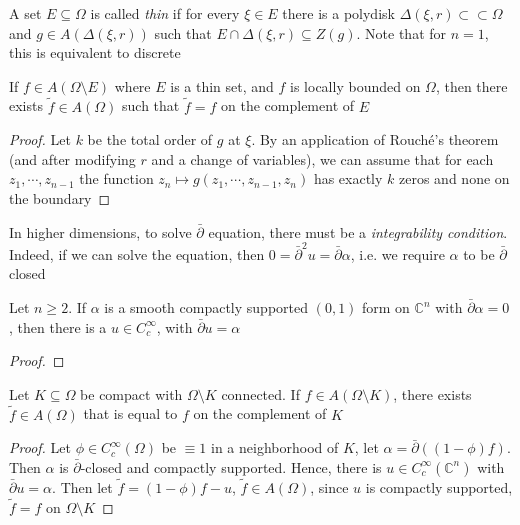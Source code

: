 \documentclass[../main.tex]{subfiles}
\begin{document}
\begin{definition}
A set $E\subseteq\Omega$ is called \textit{thin} if for every $\xi\in E$ there is a polydisk $\Delta(\xi,r)\subset\subset\Omega$ and $g\in A(\Delta(\xi,r))$ such that $E\cap\Delta(\xi,r)\subseteq Z(g)$. Note that for $n=1$, this is equivalent to discrete
\end{definition}

\begin{theorem}
If $f\in A(\Omega\setminus E)$ where $E$ is a thin set, and $f$ is locally bounded on $\Omega$, then there exists $\tilde f\in A(\Omega)$ such that $\tilde f=f$ on the complement of $E$
\end{theorem}

\begin{proof}
Let $k$ be the total order of $g$ at $\xi$. By an application of Rouch\'e's theorem (and after modifying $r$ and a change of variables), we can assume that for each $z_1,\cdots,z_{n-1}$ the function $z_n\mapsto g(z_1,\cdots,z_{n-1},z_n)$ has exactly $k$ zeros and none on the boundary
\end{proof}

In higher dimensions, to solve $\bar\partial$ equation, there must be a \textit{integrability condition}. Indeed, if we can solve the equation, then $0=\bar\partial^2u=\bar\partial\alpha$, i.e. we require $\alpha$ to be $\bar\partial$ closed

\begin{proposition}
Let $n\geq2$. If $\alpha$ is a smooth compactly supported $(0,1)$ form on $\mathbb C^n$ with $\bar\partial\alpha=0$, then there is a $u\in C_c^\infty$, with $\bar\partial u=\alpha$
\end{proposition}

\begin{proof}

\end{proof}

\begin{corollary}
Let $K\subseteq\Omega$ be compact with $\Omega\setminus K$ connected. If $f\in A(\Omega\setminus K)$, there exists $\tilde f\in A(\Omega)$ that is equal to $f$ on the complement of $K$
\end{corollary}

\begin{proof}
Let $\phi\in C_c^\infty(\Omega)$ be $\equiv1$ in a neighborhood of $K$, let $\alpha=\bar\partial((1-\phi)f)$. Then $\alpha$ is $\bar\partial$-closed and compactly supported. Hence, there is $u\in C_c^\infty(\mathbb C^n)$ with $\bar\partial u=\alpha$. Then let $\tilde f=(1-\phi)f-u$, $\tilde f\in A(\Omega)$, since $u$ is compactly supported, $\tilde f=f$ on $\Omega\setminus K$
\end{proof}
\end{document}
